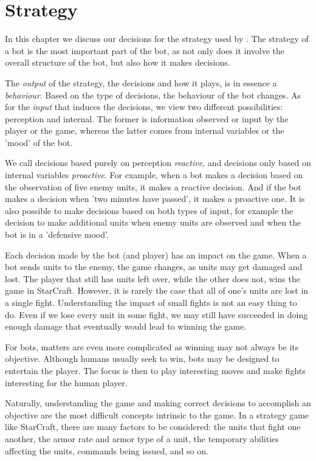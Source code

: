 
\chapter{Strategy}
\label{chap:strategy}

In this chapter we discuss our decisions for the strategy used by \massexpand{}. The strategy of a bot is the most important part of the bot, as not only does it involve the overall structure of the bot, but also how it makes decisions.

The \emph{output} of the strategy, the decisions and how it plays, is in essence a \emph{behaviour}. Based on the type of decisions, the behaviour of the bot changes. As for the \emph{input} that induces the decisions, we view two different possibilities: perception and internal. The former is information observed or input by the player or the game, whereas the latter comes from internal variables or the 'mood' of the bot.

We call decisions based purely on perception \emph{reactive}, and decisions only based on internal variables \emph{proactive}. For example, when a bot makes a decision based on the observation of five enemy units, it makes a reactive decision. And if the bot makes a decision when 'two minutes have passed', it makes a proactive one. It is also possible to make decisions based on both types of input, for example the decision to make additional units when enemy units are observed and when the bot is in a 'defensive mood'.

Each decision made by the bot (and player) has an impact on the game. When a bot sends units to the enemy, the game changes, as units may get damaged and lost. The player that still has  units left over, while the other does not, wins the game in StarCraft. However, it is rarely the case that all of one's units are lost in a single fight. Understanding the impact of small fights is not an easy thing to do. Even if we lose every unit in some fight, we may still have succeeded in doing enough damage that eventually would lead to winning the game.

For bots, matters are even more complicated as winning may not always be its objective. Although humans usually seek to win, bots may be designed to entertain the player. The focus is then to play interesting moves and make fights interesting for the human player.


Naturally, understanding the game and making correct decisions to accomplish an objective are the most difficult concepts intrinsic to the game. In a strategy game like StarCraft, there are many factors to be considered: the units that fight one another, the armor rate and armor type of a unit, the temporary abilities affecting the units, commands being issued, and so on. 

